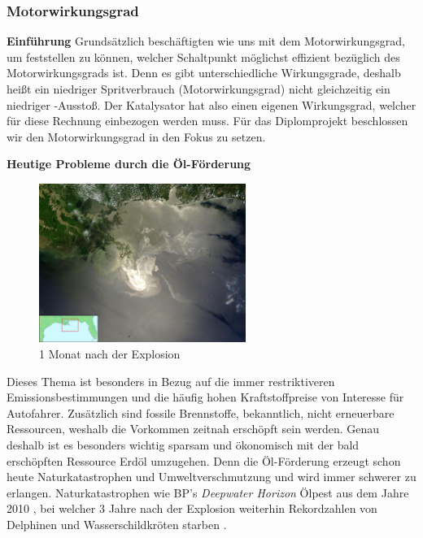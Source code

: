 \subsubsection{Motorwirkungsgrad}
\label{subsec:motorwirkungsgrad}

\textbf{Einführung\newline}
Grundsätzlich beschäftigten wie uns mit dem Motorwirkungsgrad, um feststellen zu können, welcher Schaltpunkt möglichst effizient bezüglich des Motorwirkungsgrads ist. Denn es gibt unterschiedliche Wirkungsgrade, deshalb heißt ein niedriger Spritverbrauch (Motorwirkungsgrad) nicht gleichzeitig ein niedriger -Ausstoß. Der Katalysator hat also einen eigenen Wirkungsgrad, welcher für diese Rechnung einbezogen werden muss. Für das Diplomprojekt beschlossen wir den Motorwirkungsgrad in den Fokus zu setzen.

\textbf{\newline Heutige Probleme durch die Öl-Förderung}
\begin{figure}\centering
    \includegraphics[width=0.6\textwidth]{images/bpOilSpillSatelite}
    \caption{1 Monat nach der Explosion \cite{SIMR.CH2-motorwirkungsgrad.bpOilSpillSatelite}} \label{Fig:imgBPOilSpill}
\end{figure}
Dieses Thema ist besonders in Bezug auf die immer restriktiveren Emissionsbestimmungen und die häufig hohen Kraftstoffpreise von Interesse für Autofahrer. Zusätzlich sind fossile Brennstoffe, bekanntlich, nicht erneuerbare Ressourcen, weshalb die Vorkommen zeitnah erschöpft sein werden. Genau deshalb ist es besonders wichtig sparsam und ökonomisch mit der bald erschöpften Ressource Erdöl umzugehen. 
Denn die Öl-Förderung erzeugt schon heute Naturkatastrophen und Umweltverschmutzung und wird immer schwerer zu erlangen.
Naturkatastrophen wie BP's \textit{Deepwater Horizon} Ölpest aus dem Jahre 2010 \cite{SIMR.CH2-motorwirkungsgrad.BPSpillGeneral}, bei welcher 3 Jahre nach der Explosion weiterhin Rekordzahlen von Delphinen und Wasserschildkröten starben \cite{SIMR.CH2-motorwirkungsgrad.BPSpillDeaths}. 

